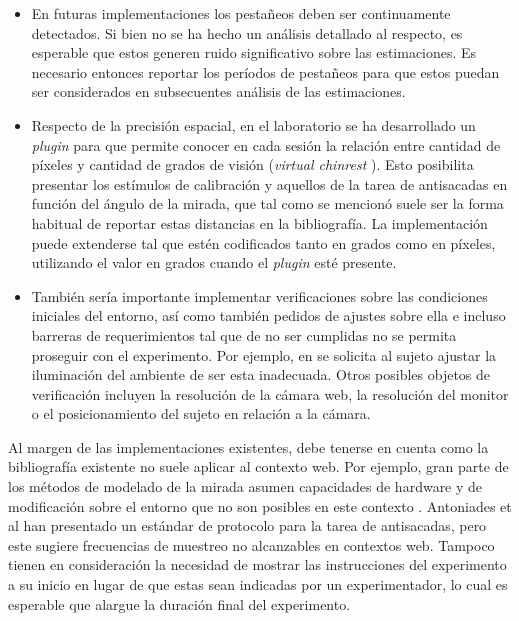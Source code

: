\begin{itemize}
  \item En futuras implementaciones los pestañeos deben ser continuamente
detectados.
  Si bien no se ha hecho un análisis detallado al respecto, es esperable que
estos generen ruido significativo sobre las estimaciones.
  Es necesario entonces reportar los períodos de pestañeos para que estos
puedan ser considerados en subsecuentes análisis de las estimaciones.

  \item Respecto de la precisión espacial, en el laboratorio se ha desarrollado
un \textit{plugin} para \jspsych que permite conocer en cada sesión la relación
entre cantidad de píxeles y cantidad de grados de visión (\textit{virtual
chinrest} \cite{li_2020_virtual_chinrest}).
  Esto posibilita presentar los estímulos de calibración y aquellos de la tarea
de antisacadas en función del ángulo de la mirada, que tal como se mencionó
suele ser la forma habitual de reportar estas distancias en la bibliografía.
  La implementación puede extenderse tal que estén codificados tanto en grados
como en píxeles, utilizando el valor en grados cuando el \textit{plugin} esté
presente.

  \item También sería importante implementar verificaciones sobre las
condiciones iniciales del entorno, así como también pedidos de ajustes sobre
ella e incluso barreras de requerimientos tal que de no ser cumplidas no se
permita proseguir con el experimento.
  Por ejemplo, en \turkergaze se solicita al sujeto ajustar la iluminación del
ambiente de ser esta inadecuada.
  Otros posibles objetos de verificación incluyen la resolución de la cámara
web, la resolución del monitor o el posicionamiento del sujeto en relación a la
cámara.
\end{itemize}


Al margen de las implementaciones existentes, debe tenerse en cuenta como la
bibliografía existente no suele aplicar al contexto web.
Por ejemplo, gran parte de los métodos de modelado de la mirada asumen
capacidades de hardware y de modificación sobre el entorno que no son posibles
en este contexto \cite{hansen_2009_eye_of_the_beholder}.
Antoniades et al \cite{antoniades_2013_standarized_protocol} han presentado un
estándar de protocolo para la tarea de antisacadas, pero este sugiere
frecuencias de muestreo no alcanzables en contextos web.
Tampoco tienen en consideración la necesidad de mostrar las instrucciones del
experimento a su inicio en lugar de que estas sean indicadas por un
experimentador, lo cual es esperable que alargue la duración final del
experimento. 

